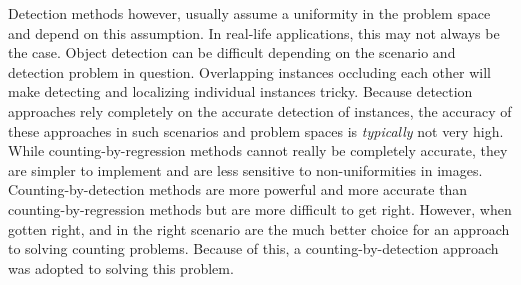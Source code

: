 Detection methods however, usually assume a uniformity in the problem space and depend on this assumption. In real-life applications, this may not always be the case. Object detection can be difficult depending on the scenario and detection problem in question. Overlapping instances occluding each other will make detecting and localizing individual instances tricky. Because detection approaches rely completely on the accurate detection of instances, the accuracy of these approaches in such scenarios and problem spaces is \textit{typically} not very high. While counting-by-regression methods cannot really be completely accurate, they are simpler to implement and are less sensitive to non-uniformities in images. Counting-by-detection methods are more powerful and more accurate than counting-by-regression methods but are more difficult to get right. However, when gotten right, and in the right scenario are the much better choice for an approach to solving counting problems. Because of this, a counting-by-detection approach was adopted to solving this problem.
\bigskip

\goodbreak
